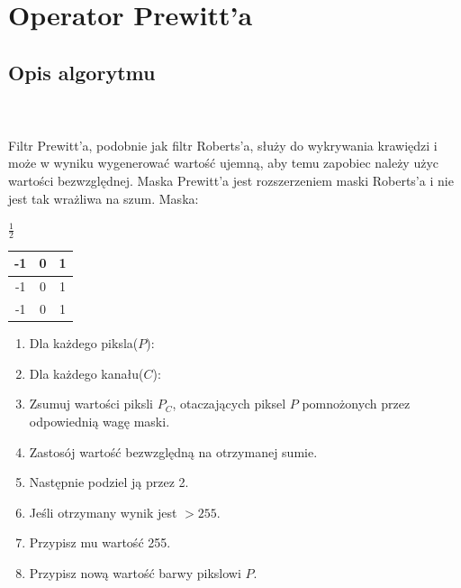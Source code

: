 \documentclass[final,a4paper,openany,12pt]{mwbk}
\begin{document}
\newpage


\section{Operator Prewitt'a}
\subsection*{Opis algorytmu}
\hfill
\\\\
\indent Filtr Prewitt'a, podobnie jak filtr Roberts'a, służy do wykrywania krawiędzi i może w wyniku wygenerować wartość ujemną, aby temu zapobiec należy użyc wartości bezwzględnej. Maska Prewitt'a jest rozszerzeniem maski Roberts'a i nie jest tak wrażliwa na szum. Maska:

\begin{center}
	$\frac{1}{2}$
	\begin{tabular}{|c|c|c|}
		\hline
		-1 & 0 & 1\\
		\hline
		-1 & 0 & 1\\
		\hline
		-1 & 0 & 1\\
		\hline
	\end{tabular}
\end{center}

\begin{enumerate}
	\item Dla każdego piksla($P$):
	\item Dla każdego kanału($C$):
	\item Zsumuj wartości piksli $P_C$, otaczających piksel $P$ pomnożonych przez odpowiednią wagę maski.
	\item Zastosój wartość bezwzględną na otrzymanej sumie.
	\item Następnie podziel ją przez 2.
	\item Jeśli otrzymany wynik jest $> 255$.
	\item Przypisz mu wartość 255.
	\item Przypisz nową wartość barwy pikslowi $P$.
\end{enumerate}
\end{document}
